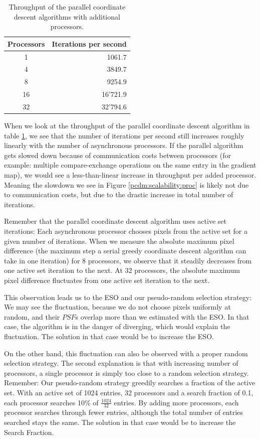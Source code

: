 \begin{table} [h]
	\centering
	\begin{tabular}{c | r }
		Processors & Iterations per second \\ \hline
		1 & 1061.7 \\
		4 & 3849.7 \\
		8 & 9254.9 \\
		16 & 16'721.9 \\
		32 & 32'794.6 \\
	\end{tabular}
	\caption{Throughput of the parallel coordinate descent algorithms with additional processors.}
	\label{pcdm:scalability:throughput}
\end{table}

When we look at the throughput of the parallel coordinate descent algorithm in table \ref{pcdm:scalability:throughput}, we see that the number of iterations per second still increases roughly linearly with the number of asynchronous processors. If the parallel algorithm gets slowed down because of communication costs between processors (for example: multiple compare-exchange operations on the same entry in the gradient map), we would see a less-than-linear increase in throughput per added processor. Meaning the slowdown we see in Figure \ref{pcdm:scalability:proc} is likely not due to communication costs, but due to the drastic increase in total number of iterations.

Remember that the parallel coordinate descent algorithm uses active set iterations: Each asynchronous processor chooses pixels from the active set for a given number of iterations. When we measure the absolute maximum pixel difference (the maximum step a serial greedy coordinate descent algorithm can take in one iteration) for 8 processors, we observe that it steadily decreases from one active set iteration to the next. At 32 processors, the absolute maximum pixel difference fluctuates from one active set iteration to the next.

This observation leads us to the ESO and our pseudo-random selection strategy: We may see the fluctuation, because we do not choose pixels uniformly at random, and their $PSF$s overlap more than we estimated with the ESO. In that case, the algorithm is in the danger of diverging, which would explain the fluctuation. The solution in that case would be to increase the ESO.

On the other hand, this fluctuation can also be observed with a proper random selection strategy. The second explanation is that with increasing number of processors, a single processor is simply too close to a random selection strategy. Remember: Our pseudo-random strategy greedily searches a fraction of the active set. With an active set of 1024 entries, 32 processors and a search fraction of 0.1, each processor searches 10\% of $\frac{1024}{32}$ entries. By adding more processors, each processor searches through fewer entries, although the total number of entries searched stays the same. The solution in that case would be to increase the Search Fraction.

